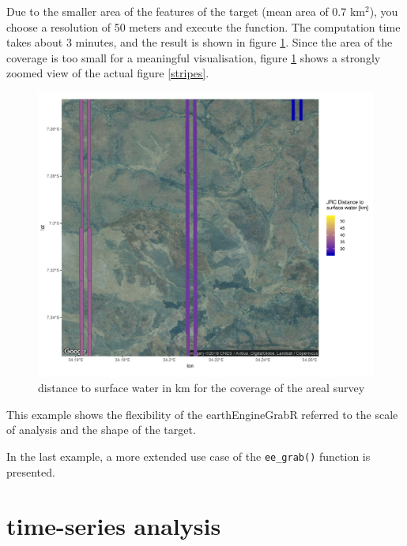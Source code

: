 Due to the smaller area of the features of the target (mean area of 0.7 km$^2$), you choose a resolution of 50 meters and execute the function. The computation time takes about 3 minutes, and the result is shown in figure \ref{session_2}. Since the area of the coverage is too small for a meaningful visualisation, figure \ref{session_2} shows a strongly zoomed view of the actual figure \ref{stripes}. 


\begin{center}
	\begin{figure}[h]
		\begin{center}
			\includegraphics[width=15cm]{images/smalle-scale-analysis-cropped.pdf}
			\caption{distance to surface water in km for the coverage of the areal survey}
			\label{session_2}
		\end{center}
	\end{figure}
\end{center}


This example shows the flexibility of the earthEngineGrabR referred to the scale of analysis and the shape of the target.

In the last example, a more extended use case of the \texttt{ee\_grab()} function is presented.


\section{time-series analysis}

